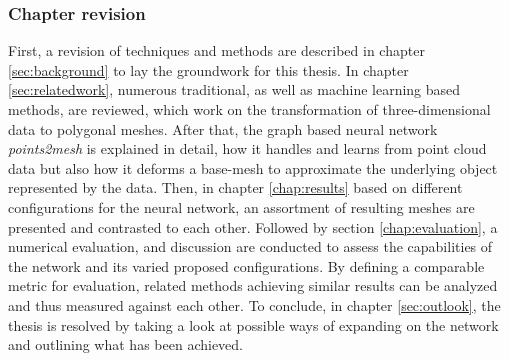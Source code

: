   \subsubsection*{Chapter revision}
  First, a revision of techniques and methods are described in chapter \ref{sec:background} to lay the groundwork for this thesis. In chapter \ref{sec:relatedwork}, 
  numerous traditional, as well as machine learning based methods, are reviewed, which work on the transformation of three-dimensional data to polygonal
  meshes.
  After that, the graph based neural network \emph{points2mesh} is explained in detail, how it handles and learns from point cloud data but also how
   it deforms a base-mesh to approximate the underlying object represented by the data.
  Then, in chapter \ref{chap:results} based on different configurations for the neural network, an assortment of resulting meshes are presented and
   contrasted to each other.
  Followed by section \ref{chap:evaluation}, a numerical evaluation, and discussion are conducted to assess the capabilities of the network and its 
  varied proposed configurations. By defining a comparable metric for evaluation, related methods achieving similar results can be analyzed and thus 
  measured against each other.
  To conclude, in chapter \ref{sec:outlook}, the thesis is resolved by taking a look at possible ways of expanding on the network and outlining what
   has been achieved.
  